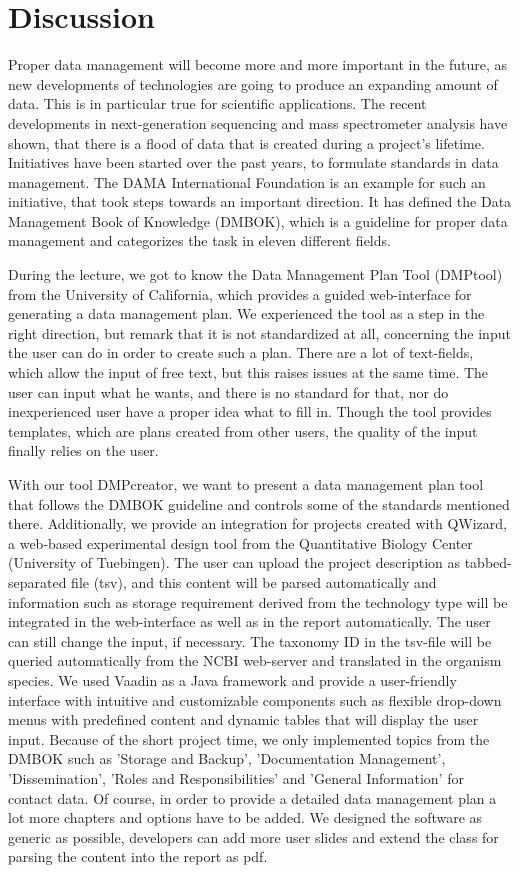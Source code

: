 \section{Discussion}
Proper data management will become more and more important in the future, as new developments of technologies are going to produce an expanding amount of data. This is in particular true for scientific applications. The recent developments in next-generation sequencing and mass spectrometer analysis have shown, that there is a flood of data that is created during a project's lifetime.
Initiatives have been started over the past years, to formulate standards in data management. The DAMA International Foundation is an example for such an initiative, that took steps towards an important direction. It has defined the Data Management Book of Knowledge (DMBOK), which is a guideline for proper data management and categorizes the task in eleven different fields. 

During the lecture, we got to know the Data Management Plan Tool (DMPtool) from the University of California, which provides a guided web-interface for generating a data management plan. We experienced the tool as a step in the right direction, but remark that it is not standardized at all, concerning the input the user can do in order to create such a plan. There are a lot of text-fields, which allow the input of free text, but this raises issues at the same time. The user can input what he wants, and there is no standard for that, nor do inexperienced user have a proper idea what to fill in. Though the tool provides templates, which are plans created from other users, the quality of the input finally relies on the user.

With our tool DMPcreator, we want to present a data management plan tool that follows the DMBOK guideline and controls some of the standards mentioned there. Additionally, we provide an integration for projects created with QWizard, a web-based experimental design tool from the Quantitative Biology Center (University of Tuebingen). The user can upload the project description as tabbed-separated file (tsv), and this content will be parsed automatically and information such as storage requirement derived from the technology type will be integrated in the web-interface as well as in the report automatically. The user can still change the input, if necessary.
The taxonomy ID in the tsv-file will be queried automatically from the NCBI web-server and translated in the organism species.
We used Vaadin as a Java framework and provide a user-friendly interface with intuitive and customizable components such as flexible drop-down menus with predefined content and dynamic tables that will display the user input. Because of the short project time, we only implemented topics from the DMBOK such as 'Storage and Backup', 'Documentation Management', 'Dissemination', 'Roles and Responsibilities' and 'General Information' for contact data. Of course, in order to provide a detailed data management plan a lot more chapters and options have to be added. We designed the software as generic as possible, developers can add more user slides and extend the class for parsing the content into the report as pdf.

